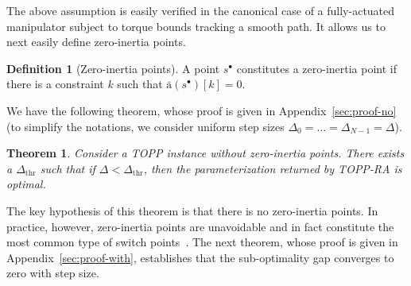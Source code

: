 \documentclass[journal]{IEEEtran}
\theoremstyle{plain}
\newtheorem{theorem}{Theorem}
\theoremstyle{definition}
\newtheorem{definition2}{Definition}
\newenvironment{definition}
  {\renewcommand{\qedsymbol}{$\lozenge$}
   \pushQED{\qed}\begin{definition2}}
  {\popQED\end{definition2}}
\theoremstyle{definition}
\renewcommand{\vec}[1]{\bm{\mathrm{#1}}}  %
\begin{document}
The above assumption is easily verified in the canonical case of a
fully-actuated manipulator subject to torque bounds tracking a smooth
path. It allows us to next easily define zero-inertia points.

\begin{definition}[Zero-inertia points]
  A point $s^\bullet$ constitutes a zero-inertia point if there is a
  constraint $k$ such that  \mbox{$\bar{\vec a}(s^\bullet)[k]=0$}.
\end{definition}




We have the following theorem, whose proof is given in
Appendix~\ref{sec:proof-no} (to simplify the notations, we consider
uniform step sizes $\Delta_0 =\dots=\Delta_{N-1} = \Delta$).

\begin{theorem}
  \label{theo:1}
  Consider a TOPP instance \emph{without zero-inertia points}. There
  exists a $\Delta_\mathrm{thr}$ such that if $\Delta <
  \Delta_\mathrm{thr}$, then the parameterization returned by TOPP-RA
  is optimal.
\end{theorem}

The key hypothesis of this theorem is that there is no zero-inertia
points.  In practice, however, zero-inertia points are unavoidable and
in fact constitute the most common type of switch
points~\cite{pham2014general}.  The next theorem, whose proof is given
in Appendix~\ref{sec:proof-with}, establishes that the sub-optimality
gap converges to zero with step size.
\end{document}
